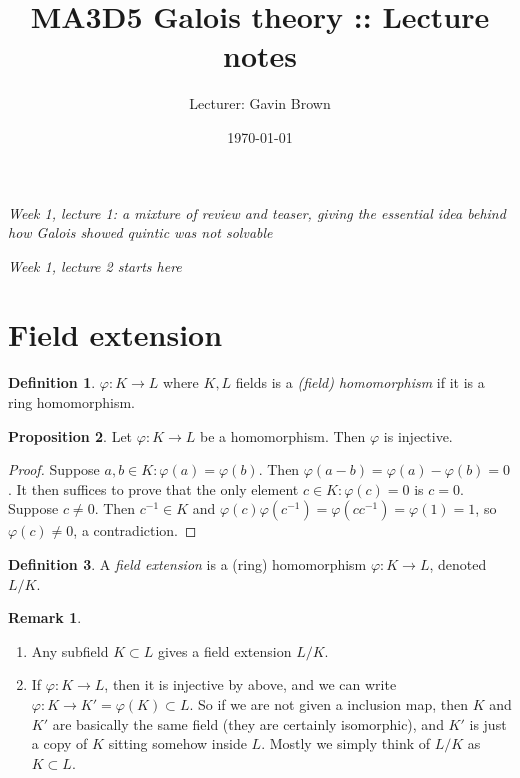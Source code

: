 \documentclass[a4paper]{article}
\title{MA3D5 Galois theory :: Lecture notes}
\author{Lecturer: Gavin Brown}
\date{\today}
\theoremstyle{definition}
\newtheorem{defn}{Definition}[subsection]
\newtheorem{prop}[defn]{Proposition}
\newtheorem*{remark}{Remark}
\begin{document}
\maketitle
\thispagestyle{empty}

\tableofcontents
\thispagestyle{empty}
\newpage
\setcounter{page}{1}
\begin{flushright}
\textit{Week 1, lecture 1: a mixture of review and teaser, giving the essential idea behind how Galois showed quintic was not solvable}

\textit{Week 1, lecture 2 starts here}
\end{flushright}
\section{Field extension}
\begin{defn}
$\varphi:K\rightarrow L$ where $K,L$ fields is a \textit{(field) homomorphism} if it is a ring homomorphism.
\end{defn}
\begin{prop}
\label{prop:fieldhomisinj}
Let $\varphi:K\rightarrow L$ be a homomorphism. Then $\varphi$ is injective.
\end{prop}
\begin{proof}
Suppose $a,b\in K:\varphi(a)=\varphi(b)$. Then $\varphi(a-b)=\varphi(a)-\varphi(b)=0$. It then suffices to prove that the only element $c\in K:\varphi(c)=0$ is $c=0$. Suppose $c\neq 0$. Then $c^{-1}\in K$ and $\varphi(c)\varphi(c^{-1})=\varphi(cc^{-1})=\varphi(1)=1$, so $\varphi(c)\neq 0$, a contradiction.
\end{proof}
\begin{defn}
A \textit{field extension} is a (ring) homomorphism $\varphi:K\rightarrow L$, denoted $L/K$.
\end{defn}
\begin{remark}
\begin{enumerate}
\item Any subfield $K\subset L$ gives a field extension $L/K$.
\item If $\varphi:K\rightarrow L$, then it is injective by above, and we can write $\varphi:K\rightarrow K'=\varphi(K)\subset L$. So if we are not given a inclusion map, then $K$ and $K'$ are basically the same field (they are certainly isomorphic), and $K'$ is just a copy of $K$ sitting somehow inside $L$. Mostly we simply think of $L/K$ as $K\subset L$.
\end{enumerate}
\end{remark}
\end{document}
